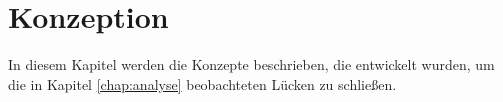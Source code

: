 \chapter{Konzeption} \label{chap:konzeption}

In diesem Kapitel werden die Konzepte beschrieben, die entwickelt wurden, um die in Kapitel \ref{chap:analyse} beobachteten Lücken zu schließen.



